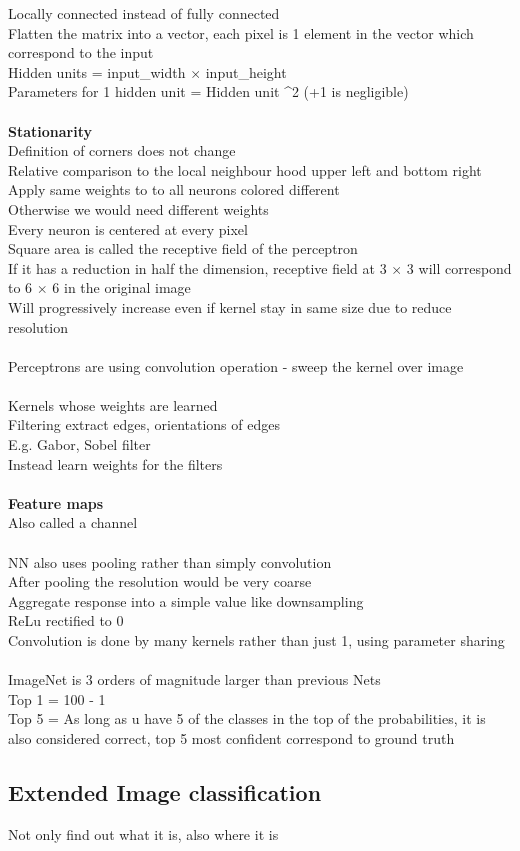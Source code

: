 \documentclass[11pt]{article}
\begin{document}
Locally connected instead of fully connected
\\
Flatten the matrix into a vector, each pixel is 1 element in the vector which correspond to the input	
\\
Hidden units = input\_width $\times$ input\_height
\\
Parameters for 1 hidden unit = Hidden unit ^2\) (+1 is negligible)
\\\)\\
\textbf{Stationarity}\\
Definition of corners does not change\\
Relative comparison to the local neighbour hood upper left and bottom right\\
Apply same weights to to all neurons colored different
\\
Otherwise we would need different weights\\
Every neuron is centered at every pixel\\
Square area is called the receptive field of the perceptron\\
If it has a reduction in half the dimension, receptive field at 3 $\times$ 3 will correspond to 6 $\times$ 6 in the original image\\
Will progressively increase even if kernel stay in same size due to reduce resolution
\\\\
Perceptrons are using convolution operation - sweep the kernel over image 
\\
\\
Kernels whose weights are learned\\
Filtering extract edges, orientations of edges
\\
E.g. Gabor, Sobel filter
\\
Instead learn weights for the filters
\\\\
\textbf{Feature maps}\\
Also called a channel\\
\\
NN also uses pooling rather than simply convolution
\\
After pooling the resolution would be very coarse\\
Aggregate response into a simple value like downsampling
\\
ReLu rectified to 0
\\
Convolution is done by many kernels rather than just 1, using parameter sharing
\\
\\
ImageNet is 3 orders of magnitude larger than previous Nets
\\
Top 1 = 100 - 1\\
Top 5 = As long as u have 5 of the classes in the top of the probabilities, it is also considered correct, top 5 most confident correspond to ground truth
\\
\subsection*{Extended Image classification}
Not only find out what it is, also where it is
\end{document}
